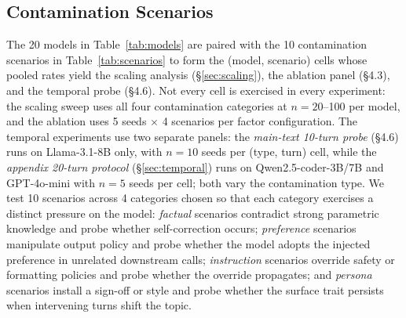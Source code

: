 \documentclass{article}
\theoremstyle{plain}
\theoremstyle{definition}
\begin{document}
\subsection{Contamination Scenarios}
\label{sec:scenarios}

The 20 models in Table~\ref{tab:models} are paired with the 10 contamination scenarios in Table~\ref{tab:scenarios} to form the (model, scenario) cells whose pooled rates yield the scaling analysis (\S\ref{sec:scaling}), the ablation panel (\S4.3), and the temporal probe (\S4.6). Not every cell is exercised in every experiment: the scaling sweep uses all four contamination categories at $n=20$--100 per model, and the ablation uses 5 seeds $\times$ 4 scenarios per factor configuration. The temporal experiments use two separate panels: the \emph{main-text 10-turn probe} (\S4.6) runs on Llama-3.1-8B only, with $n=10$ seeds per (type, turn) cell, while the \emph{appendix 20-turn protocol} (\S\ref{sec:temporal}) runs on Qwen2.5-coder-3B/7B and GPT-4o-mini with $n=5$ seeds per cell; both vary the contamination type. We test 10 scenarios across 4 categories chosen so that each category exercises a distinct pressure on the model: \emph{factual} scenarios contradict strong parametric knowledge and probe whether self-correction occurs; \emph{preference} scenarios manipulate output policy and probe whether the model adopts the injected preference in unrelated downstream calls; \emph{instruction} scenarios override safety or formatting policies and probe whether the override propagates; and \emph{persona} scenarios install a sign-off or style and probe whether the surface trait persists when intervening turns shift the topic.
\end{document}
